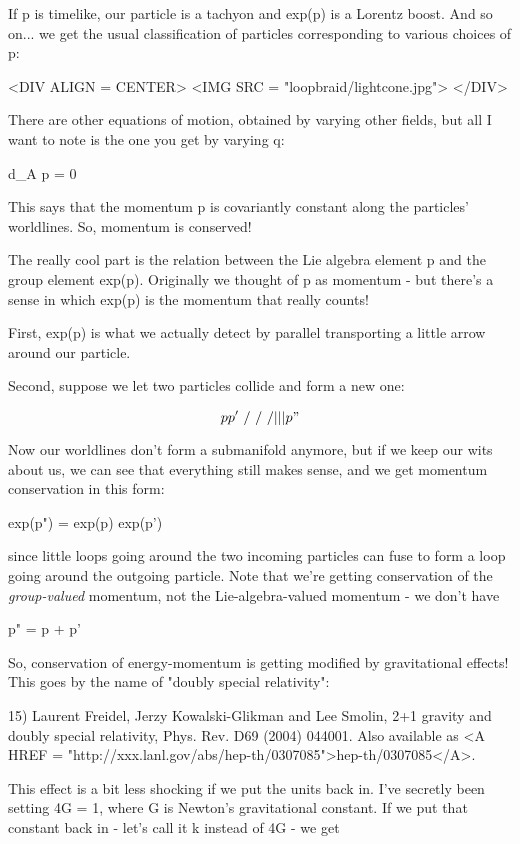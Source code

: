 If p is timelike, our particle is a tachyon and exp(p) is a Lorentz
boost.  And so on... we get the usual classification of particles
corresponding to various choices of p:

<DIV ALIGN = CENTER>
<IMG SRC = "loopbraid/lightcone.jpg">
</DIV>


There are other equations of motion, obtained by varying other fields,
but all I want to note is the one you get by varying q:

d_{A} p = 0

This says that the momentum p is covariantly constant along the
particles' worldlines.  So, momentum is conserved!

The really cool part is the relation between the Lie algebra element p 
and the group element exp(p).  Originally we thought of p as momentum - 
but there's a sense in which exp(p) is the momentum that really counts!  

First, exp(p) is what we actually detect by parallel transporting a 
little arrow around our particle.  

Second, suppose we let two particles collide and form a new one:


$$

    p       p'
     \     /
      \   /  
       \ /  
        |   
        |   
        |    
        p"
$$
    

Now our worldlines don't form a submanifold anymore, but if we keep 
our wits about us, we can see that everything still makes sense, and
we get momentum conservation in this form:

exp(p") = exp(p) exp(p')

since little loops going around the two incoming particles can fuse to 
form a loop going around the outgoing particle.  Note that we're getting
conservation of the \emph{group-valued} momentum, not the Lie-algebra-valued
momentum - we don't have

p" = p + p'

So, conservation of energy-momentum is getting modified by gravitational
effects!  This goes by the name of "doubly special relativity":

15) Laurent Freidel, Jerzy Kowalski-Glikman and Lee Smolin, 
2+1 gravity and doubly special relativity, Phys. Rev. D69 (2004) 
044001.  Also available as <A HREF = "http://xxx.lanl.gov/abs/hep-th/0307085">hep-th/0307085</A>.

This effect is a bit less shocking if we put the units back in.  I've
secretly been setting 4\pi G = 1, where G is Newton's gravitational 
constant.  If we put that constant back in - let's call it k instead 
of 4\pi G - we get

